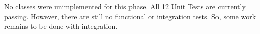 No classes were unimplemented for this phase.  All 12 Unit Tests are
currently passing.  However, there are still no functional or
integration tests.  So, some work remains to be done with integration.

